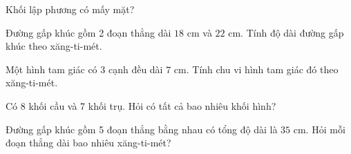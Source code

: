 \begin{ex} %
Khối lập phương có mấy mặt?
\end{ex}

\begin{ex} %
Đường gấp khúc gồm 2 đoạn thẳng dài $18\text{ cm}$ và $22\text{ cm}$. Tính độ dài đường gấp khúc theo xăng-ti-mét.
\end{ex}

\begin{ex} %
Một hình tam giác có 3 cạnh đều dài $7\text{ cm}$. Tính chu vi hình tam giác đó theo xăng-ti-mét.
\end{ex}

\begin{ex} %
Có 8 khối cầu và 7 khối trụ. Hỏi có tất cả bao nhiêu khối hình?
\end{ex}

\begin{ex} %
Đường gấp khúc gồm 5 đoạn thẳng bằng nhau có tổng độ dài là $35\text{ cm}$. Hỏi mỗi đoạn thẳng dài bao nhiêu xăng-ti-mét?
\end{ex}
